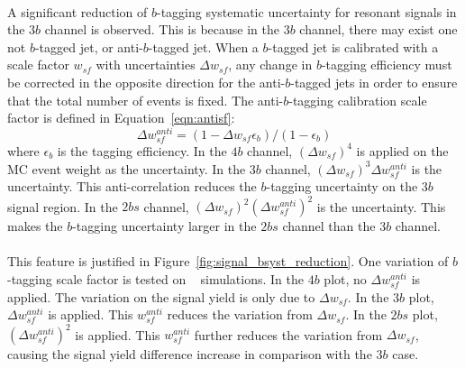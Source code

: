 \paragraph{}
A significant reduction of $b$-tagging systematic uncertainty for resonant signals in the $3b$ channel is observed. 
This is because in the $3b$ channel, there may exist one not $b$-tagged jet, or anti-$b$-tagged jet.
When a $b$-tagged jet is calibrated with a scale factor $w_{sf}$ with uncertainties $\Delta w_{sf}$, any change in $b$-tagging efficiency must be corrected in the opposite direction for the anti-$b$-tagged jets in order to ensure that the total number of events is fixed. 
The anti-$b$-tagging calibration scale factor is defined in Equation~\ref{eqn:antisf}:
\begin{equation}
\label{eqn:antisf}
\Delta  w_{sf}^{anti} = (1 - \Delta  w_{sf} \epsilon_{b}) / (1 - \epsilon_{b})
\end{equation}
where $\epsilon_{b}$ is the tagging efficiency.
In the $4b$ channel, $(\Delta w_{sf})^4$ is applied on the MC event weight as the uncertainty.
In the $3b$ channel, $(\Delta w_{sf})^3 \Delta  w_{sf}^{anti} $ is the uncertainty.
This anti-correlation reduces the $b$-tagging uncertainty on the $3b$ signal region. 
In the $2bs$ channel, $(\Delta w_{sf})^2 (\Delta  w_{sf}^{anti})^2 $ is the uncertainty.
This makes the $b$-tagging uncertainty larger in the $2bs$ channel than the $3b$ channel.

\paragraph{}
This feature is justified in Figure~\ref{fig:signal_bsyst_reduction}.
One variation of $b$-tagging scale factor is tested on \Grav~ simulations.
In the $4b$ plot, no $\Delta  w_{sf}^{anti}$ is applied. 
The variation on the signal yield is only due to $\Delta w_{sf}$.
In the $3b$ plot, $\Delta  w_{sf}^{anti}$ is applied. 
This $w_{sf}^{anti}$ reduces the variation from $\Delta w_{sf}$.
In the $2bs$ plot, $(\Delta  w_{sf}^{anti})^2$ is applied. 
This $w_{sf}^{anti}$ further reduces the variation from $\Delta w_{sf}$, causing the signal yield difference increase in comparison with the $3b$ case.

